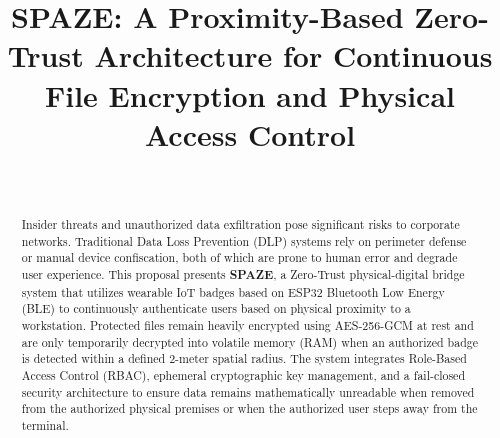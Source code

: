 \documentclass[conference]{IEEEtran}
\begin{document}
\title{SPAZE: A Proximity-Based Zero-Trust Architecture for Continuous File Encryption and Physical Access Control}

\author{
    \\[1em]
}

\maketitle

\begin{abstract}
Insider threats and unauthorized data exfiltration pose significant risks to corporate networks. Traditional Data Loss Prevention (DLP) systems rely on perimeter defense or manual device confiscation, both of which are prone to human error and degrade user experience. This proposal presents \textbf{SPAZE}, a Zero-Trust physical-digital bridge system that utilizes wearable IoT badges based on ESP32 Bluetooth Low Energy (BLE) to continuously authenticate users based on physical proximity to a workstation. Protected files remain heavily encrypted using AES-256-GCM at rest and are only temporarily decrypted into volatile memory (RAM) when an authorized badge is detected within a defined 2-meter spatial radius. The system integrates Role-Based Access Control (RBAC), ephemeral cryptographic key management, and a fail-closed security architecture to ensure data remains mathematically unreadable when removed from the authorized physical premises or when the authorized user steps away from the terminal.
\end{abstract}
\end{document}
